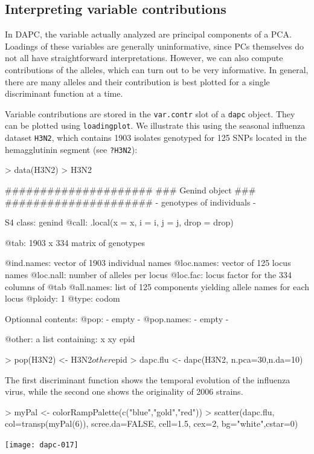 \documentclass{article}
\begin{document}
\subsection{Interpreting variable contributions}

In DAPC, the variable actually analyzed are principal components of a PCA.
Loadings of these variables are generally uninformative, since PCs themselves do not all have
straightforward interpretations.
However, we can also compute contributions of the alleles, which can turn out to be very informative.
In general, there are many alleles and their contribution is best plotted for a single discriminant
function at a time.

Variable contributions are stored in the \texttt{var.contr} slot of a \texttt{dapc} object.
They can be plotted using \texttt{loadingplot}.
We illustrate this using the seasonal influenza dataset \texttt{H3N2}, which contains 1903 isolates
genotyped for 125 SNPs located in the hemagglutinin segment (see \texttt{?H3N2}):
\begin{Schunk}
\begin{Sinput}
> data(H3N2)
> H3N2
\end{Sinput}
\begin{Soutput}
   #####################
   ### Genind object ### 
   #####################
- genotypes of individuals - 

S4 class:  genind
@call: .local(x = x, i = i, j = j, drop = drop)

@tab:  1903 x 334 matrix of genotypes

@ind.names: vector of  1903 individual names
@loc.names: vector of  125 locus names
@loc.nall: number of alleles per locus
@loc.fac: locus factor for the  334 columns of @tab
@all.names: list of  125 components yielding allele names for each locus
@ploidy:  1
@type:  codom

Optionnal contents: 
@pop:  - empty -
@pop.names:  - empty -

@other: a list containing: x  xy  epid 
\end{Soutput}
\begin{Sinput}
> pop(H3N2) <- H3N2$other$epid
> dapc.flu <- dapc(H3N2, n.pca=30,n.da=10)
\end{Sinput}
\end{Schunk}

The first discriminant function shows the temporal evolution of the influenza virus, while the
second one shows the originality of 2006 strains.
\begin{Schunk}
\begin{Sinput}
> myPal <- colorRampPalette(c("blue","gold","red"))
> scatter(dapc.flu, col=transp(myPal(6)), scree.da=FALSE, cell=1.5, cex=2, bg="white",cstar=0)
\end{Sinput}
\end{Schunk}
\texttt{[image: dapc-017]}
\end{document}
